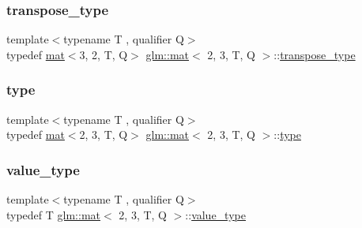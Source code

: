 \mbox{\label{structglm_1_1mat_3_012_00_013_00_01_t_00_01_q_01_4_a5e827ce80d430334f2815fa8eb6aeb06}} 
\subsubsection{\texorpdfstring{transpose\+\_\+type}{transpose\_type}}
{\footnotesize\ttfamily template$<$typename T , qualifier Q$>$ \\
typedef \mbox{\hyperlink{structglm_1_1mat}{mat}}$<$3, 2, T, Q$>$ \mbox{\hyperlink{structglm_1_1mat}{glm\+::mat}}$<$ 2, 3, T, Q $>$\+::\mbox{\hyperlink{structglm_1_1mat_3_012_00_013_00_01_t_00_01_q_01_4_a5e827ce80d430334f2815fa8eb6aeb06}{transpose\+\_\+type}}}

\mbox{\label{structglm_1_1mat_3_012_00_013_00_01_t_00_01_q_01_4_a8a283bdf36e731e243e185a5dc783070}} 
\subsubsection{\texorpdfstring{type}{type}}
{\footnotesize\ttfamily template$<$typename T , qualifier Q$>$ \\
typedef \mbox{\hyperlink{structglm_1_1mat}{mat}}$<$2, 3, T, Q$>$ \mbox{\hyperlink{structglm_1_1mat}{glm\+::mat}}$<$ 2, 3, T, Q $>$\+::\mbox{\hyperlink{structglm_1_1mat_3_012_00_013_00_01_t_00_01_q_01_4_a8a283bdf36e731e243e185a5dc783070}{type}}}

\mbox{\label{structglm_1_1mat_3_012_00_013_00_01_t_00_01_q_01_4_a16f6111e5e9f3d29da5926277e63f668}} 
\subsubsection{\texorpdfstring{value\+\_\+type}{value\_type}}
{\footnotesize\ttfamily template$<$typename T , qualifier Q$>$ \\
typedef T \mbox{\hyperlink{structglm_1_1mat}{glm\+::mat}}$<$ 2, 3, T, Q $>$\+::\mbox{\hyperlink{structglm_1_1mat_3_012_00_013_00_01_t_00_01_q_01_4_a16f6111e5e9f3d29da5926277e63f668}{value\+\_\+type}}}



